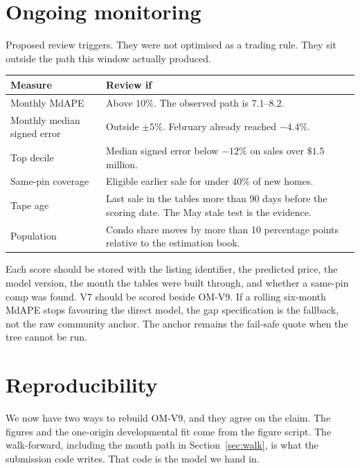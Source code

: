 \documentclass[11pt]{article}
\newcommand{\modelid}{OM-V9}
\begin{document}
\section{Ongoing monitoring}
\label{sec:monitor}

Proposed review triggers. They were not optimised as a trading rule. They sit outside the path this window actually produced.

\begin{center}
\begin{tabular}{p{5.2cm}p{8.2cm}}
\toprule
Measure & Review if \\
\midrule
Monthly MdAPE & Above \(10\%\). The observed path is \(7.1\)--\(8.2\). \\
Monthly median signed error & Outside \(\pm 5\%\). February already reached \(-4.4\%\). \\
Top decile & Median signed error below \(-12\%\) on sales over \(\$1.5\) million. \\
Same-pin coverage & Eligible earlier sale for under \(40\%\) of new homes. \\
Tape age & Last sale in the tables more than 90 days before the scoring date. The May stale test is the evidence. \\
Population & Condo share moves by more than 10 percentage points relative to the estimation book. \\
\bottomrule
\end{tabular}
\end{center}

Each score should be stored with the listing identifier, the predicted price, the model version, the month the tables were built through, and whether a same-pin comp was found. V7 should be scored beside \modelid{}. If a rolling six-month MdAPE stops favouring the direct model, the gap specification is the fallback, not the raw community anchor. The anchor remains the fail-safe quote when the tree cannot be run.

\section{Reproducibility}
\label{sec:repro}

We now have two ways to rebuild \modelid{}, and they agree on the claim. The figures and the one-origin developmental fit come from the figure script. The walk-forward, including the month path in Section~\ref{sec:walk}, is what the submission code writes. That code is the model we hand in.
\end{document}

